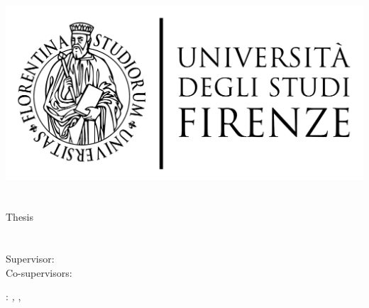 \begin{titlepage}
	\begin{center}
   	\large
      \hfill
      \vfill
      \begingroup
      \includegraphics[scale=0.15]{static/logo/LOGO}\\
			\myFaculty \\
			\myDegree \\ 
			\vspace{0.5cm}
         \vspace{0.5cm}    
         Thesis    
      \endgroup 
      \vfill 
      \begingroup
      	\color{Maroon}\spacedallcaps{\myEnglishTitle} \\ $\ $\\
      	\spacedallcaps{\myItalianTitle} \\ 	
	\bigskip
      \endgroup
      \spacedlowsmallcaps{\myName}
      \vfill 
      \vfill
      Supervisor: \emph{\mySupervisor}\\
      Co-supervisors: \emph{\myOtherProf}\\
      \vfill
      \vfill
      \myTime
      \vfill                      
	\end{center}        
\end{titlepage}   
   \newpage
	\thispagestyle{empty}
	\hfill
	\vfill
	\noindent\myName: 
	\textit{\myEnglishTitle,} 
	\myDegree, \textcopyright\ \myTime

